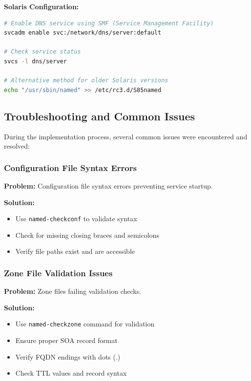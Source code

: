 \documentclass[12pt,a4paper]{article}
\begin{document}
\textbf{Solaris Configuration:}
\begin{lstlisting}[language=bash, caption=Solaris Service Persistence]
# Enable DNS service using SMF (Service Management Facility)
svcadm enable svc:/network/dns/server:default

# Check service status
svcs -l dns/server

# Alternative method for older Solaris versions
echo "/usr/sbin/named" >> /etc/rc3.d/S85named
\end{lstlisting}

\subsection{Troubleshooting and Common Issues}\label{subsec:troubleshooting}

During the implementation process, several common issues were encountered and resolved:

\subsubsection{Configuration File Syntax Errors}
\begin{tcolorbox}[title=Issue: named-checkconf failures]
\textbf{Problem:} Configuration file syntax errors preventing service startup.

\textbf{Solution:} 
\begin{itemize}
    \item Use \texttt{named-checkconf} to validate syntax
    \item Check for missing closing braces and semicolons
    \item Verify file paths exist and are accessible
\end{itemize}
\end{tcolorbox}

\subsubsection{Zone File Validation Issues}
\begin{tcolorbox}[title=Issue: Zone file format errors]
\textbf{Problem:} Zone files failing validation checks.

\textbf{Solution:}
\begin{itemize}
    \item Use \texttt{named-checkzone} command for validation
    \item Ensure proper SOA record format
    \item Verify FQDN endings with dots (.)
    \item Check TTL values and record syntax
\end{itemize}
\end{tcolorbox}
\end{document}
